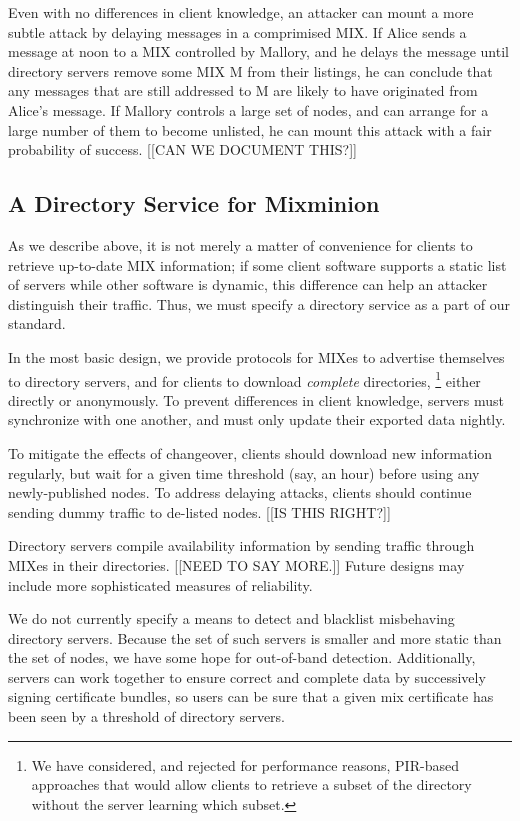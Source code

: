 \documentclass{llncs}
\begin{document}
Even with no differences in client knowledge, an attacker can mount a
more subtle attack by delaying messages in a comprimised MIX.  If
Alice sends a message at noon to a MIX controlled by Mallory, and he
delays the message until directory servers remove some MIX M from
their listings, he can conclude that any messages that are still
addressed to M are likely to have originated from Alice's message.  If
Mallory controls a large set of nodes, and can arrange for a large
number of them to become unlisted, he can mount this attack with a
fair probability of success. [[CAN WE DOCUMENT THIS?]]

\subsection{A Directory Service for Mixminion}
\label{subsec:dir-server-design}

As we describe above, it is not merely a matter of convenience for
clients to retrieve up-to-date MIX information; if some client
software supports a static list of servers while other software is
dynamic, this difference can help an attacker distinguish their
traffic.  Thus, we must specify a directory service as a part of our
standard.

In the most basic design, we provide protocols for MIXes to advertise
themselves to directory servers, and for clients to download
\emph{complete} directories,
  \footnote{We have considered, and rejected for performance reasons, 
            PIR-based \cite{PIR} approaches that would allow clients
            to retrieve a subset of the directory without the
            server learning which subset.} 
either directly or anonymously.  To prevent differences in client
knowledge, servers must synchronize with one another, and must only
update their exported data nightly.

To mitigate the effects of changeover, clients should download new
information regularly, but wait for a given time threshold (say, an
hour) before using any newly-published nodes.  To address delaying
attacks, clients should continue sending dummy traffic to de-listed
nodes. [[IS THIS RIGHT?]]

Directory servers compile availability information by sending traffic
through MIXes in their directories. [[NEED TO SAY MORE.]] Future
designs may include more sophisticated measures of reliability.

We do not currently specify a means to detect and blacklist
misbehaving directory servers.  Because the set of such servers is
smaller and more static than the set of nodes, we have some hope for
out-of-band detection.  Additionally, servers can work together to
ensure correct and complete data by successively signing certificate
bundles, so users can be sure that a given mix certificate has been
seen by a threshold of directory servers.
\end{document}
